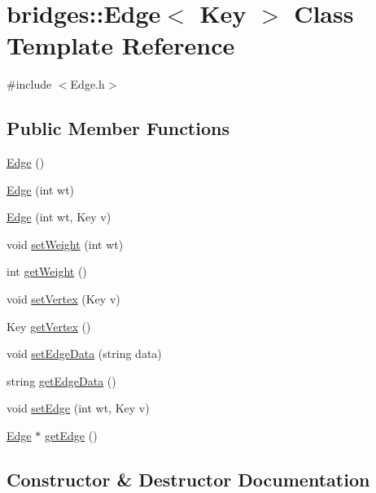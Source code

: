 \hypertarget{classbridges_1_1_edge}{}\section{bridges\+:\+:Edge$<$ Key $>$ Class Template Reference}
\label{classbridges_1_1_edge}


{\ttfamily \#include $<$Edge.\+h$>$}

\subsection*{Public Member Functions}
\begin{DoxyCompactItemize}
\item 
\hyperlink{classbridges_1_1_edge_aa829f4c7a2c7674dcbbb649dc3dc7996}{Edge} ()
\item 
\hyperlink{classbridges_1_1_edge_aae34da5b01b0663b5ca1cb724872fd7d}{Edge} (int wt)
\item 
\hyperlink{classbridges_1_1_edge_a63e84d686135b5a9158b36819d422ea2}{Edge} (int wt, Key v)
\item 
void \hyperlink{classbridges_1_1_edge_a404b1be315c3ba5a7da48d22750fd90f}{set\+Weight} (int wt)
\item 
int \hyperlink{classbridges_1_1_edge_abb0a90b93b1ee135dd19464780d25620}{get\+Weight} ()
\item 
void \hyperlink{classbridges_1_1_edge_a5b6df66e9af59226d2692b7057eeea37}{set\+Vertex} (Key v)
\item 
Key \hyperlink{classbridges_1_1_edge_aa604e71bc9068ca68d95e49adcf63920}{get\+Vertex} ()
\item 
void \hyperlink{classbridges_1_1_edge_ab21c0f917e8a3a40e871fb49957103ba}{set\+Edge\+Data} (string data)
\item 
string \hyperlink{classbridges_1_1_edge_a3bc88f8f713f29a207ff572d9f8fead6}{get\+Edge\+Data} ()
\item 
void \hyperlink{classbridges_1_1_edge_af9aff4af3f19becfaf4b05369c25c0ce}{set\+Edge} (int wt, Key v)
\item 
\hyperlink{classbridges_1_1_edge}{Edge} $\ast$ \hyperlink{classbridges_1_1_edge_acc1b8dd71672737ede797a5b24b64c4a}{get\+Edge} ()
\end{DoxyCompactItemize}


\subsection{Constructor \& Destructor Documentation}
\hypertarget{classbridges_1_1_edge_aa829f4c7a2c7674dcbbb649dc3dc7996}{}
